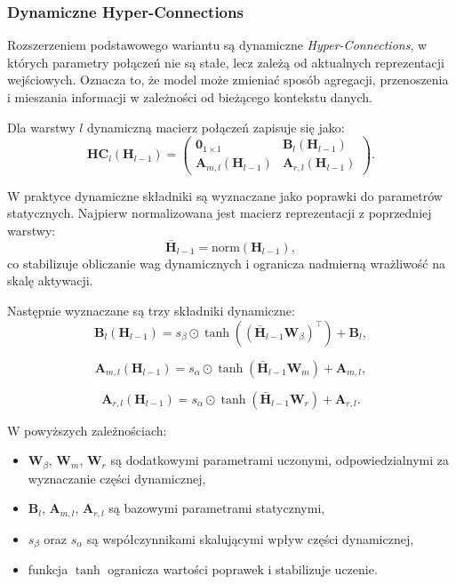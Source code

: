 \subsubsection*{Dynamiczne Hyper-Connections}

Rozszerzeniem podstawowego wariantu są dynamiczne \textit{Hyper-Connections}, w których
parametry połączeń nie są stałe, lecz zależą od aktualnych reprezentacji wejściowych.
Oznacza to, że model może zmieniać sposób agregacji, przenoszenia i mieszania informacji
w zależności od bieżącego kontekstu danych.

Dla warstwy \(l\) dynamiczną macierz połączeń zapisuje się jako:
\begin{equation}
	\mathbf{HC}_l(\mathbf{H}_{l-1}) =
	\begin{pmatrix}
		\mathbf{0}_{1\times1} & \mathbf{B}_l(\mathbf{H}_{l-1}) \\
		\mathbf{A}_{m,l}(\mathbf{H}_{l-1}) & \mathbf{A}_{r,l}(\mathbf{H}_{l-1})
	\end{pmatrix}.
\end{equation}

W praktyce dynamiczne składniki są wyznaczane jako poprawki do parametrów statycznych.
Najpierw normalizowana jest macierz reprezentacji z poprzedniej warstwy:
\begin{equation}
	\bar{\mathbf{H}}_{l-1} = \mathrm{norm}(\mathbf{H}_{l-1}),
\end{equation}
co stabilizuje obliczanie wag dynamicznych i ogranicza nadmierną wrażliwość na skalę
aktywacji.

Następnie wyznaczane są trzy składniki dynamiczne:
\begin{equation}
	\mathbf{B}_l(\mathbf{H}_{l-1}) =
	s_{\beta}\odot\tanh\!\left((\bar{\mathbf{H}}_{l-1}\mathbf{W}_{\beta})^{\top}\right)
	+ \mathbf{B}_l,
\end{equation}

\begin{equation}
	\mathbf{A}_{m,l}(\mathbf{H}_{l-1}) =
	s_{\alpha}\odot\tanh\!\left(\bar{\mathbf{H}}_{l-1}\mathbf{W}_{m}\right)
	+ \mathbf{A}_{m,l},
\end{equation}

\begin{equation}
	\mathbf{A}_{r,l}(\mathbf{H}_{l-1}) =
	s_{\alpha}\odot\tanh\!\left(\bar{\mathbf{H}}_{l-1}\mathbf{W}_{r}\right)
	+ \mathbf{A}_{r,l}.
\end{equation}

W powyższych zależnościach:
\begin{itemize}
	\item \(\mathbf{W}_{\beta}\), \(\mathbf{W}_{m}\), \(\mathbf{W}_{r}\) są dodatkowymi
	parametrami uczonymi, odpowiedzialnymi za wyznaczanie części dynamicznej,
	\item \(\mathbf{B}_l\), \(\mathbf{A}_{m,l}\), \(\mathbf{A}_{r,l}\) są bazowymi
	parametrami statycznymi,
	\item \(s_{\beta}\) oraz \(s_{\alpha}\) są współczynnikami skalującymi wpływ części
	dynamicznej,
	\item funkcja \(\tanh\) ogranicza wartości poprawek i stabilizuje uczenie.
\end{itemize}

